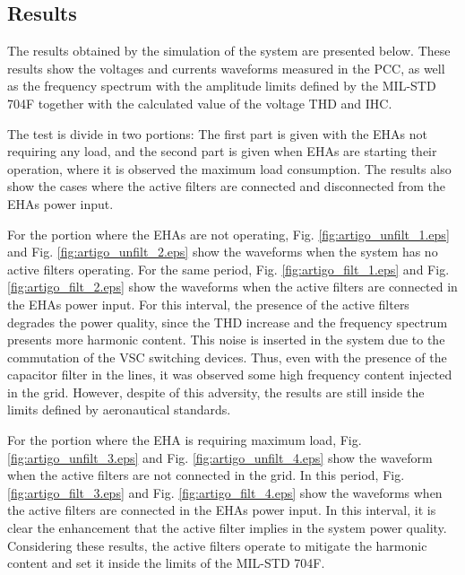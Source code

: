\subsection{Results}

The results obtained by the simulation of the system are presented below. These results show the voltages and currents waveforms measured in the PCC, as well as the frequency spectrum with the amplitude limits defined by the MIL-STD 704F together with the calculated value of the voltage THD and IHC.

The test is divide in two portions: The first part is given with the EHAs not requiring any load, and the second part is given when EHAs are starting their operation, where it is observed the maximum load consumption. The results also show the cases where the active filters are connected and disconnected from the EHAs power input.

For the portion where the EHAs are not operating, Fig. \ref{fig:artigo_unfilt_1.eps} and Fig. \ref{fig:artigo_unfilt_2.eps} show the waveforms when the system has no active filters operating. For the same period, Fig. \ref{fig:artigo_filt_1.eps} and Fig. \ref{fig:artigo_filt_2.eps} show the waveforms when the active filters are connected in the EHAs power input. For this interval, the presence of the active filters degrades the power quality, since the THD increase and the frequency spectrum presents more harmonic content. This noise is inserted in the system due to the commutation of the VSC switching devices. Thus, even with the presence of the capacitor filter in the lines, it was observed some high frequency content injected in the grid. However, despite of this adversity, the results are still inside the limits defined by aeronautical standards.

For the portion where the EHA is requiring maximum load, Fig. \ref{fig:artigo_unfilt_3.eps} and Fig. \ref{fig:artigo_unfilt_4.eps} show the waveform when the active filters are not connected in the grid. In this period, Fig. \ref{fig:artigo_filt_3.eps} and Fig. \ref{fig:artigo_filt_4.eps} show the waveforms when the active filters are connected in the EHAs power input. In this interval, it is clear the enhancement that the active filter implies in the system power quality. Considering these results, the active filters operate to mitigate the harmonic content and set it inside the limits of the MIL-STD 704F.



